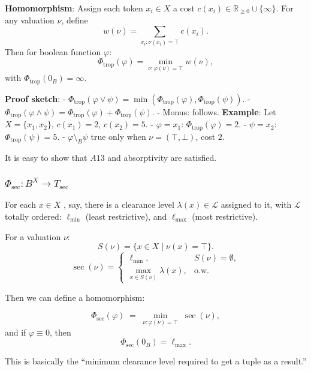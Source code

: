\textbf{Homomorphism}:\newline
Assign each token \(x_i\in X\) a cost \(c(x_i)\in\mathbb{R}_{\ge0}\cup\{\infty\}\). For any valuation \(\nu\), define
$$
w(\nu) = \sum_{x_i:\nu(x_i)=\top} c(x_i).
$$
Then for boolean function  \(\varphi\):
$$
\Phi_{\mathrm{trop}}(\varphi) 
= \min_{\nu:\varphi(\nu)=\top} w(\nu),
$$
with \(\Phi_{\mathrm{trop}}(0_B)=\infty\).
\newline

\textbf{Proof sketch}: \newline
- \(\Phi_{\mathrm{trop}}(\varphi \vee \psi) = \min(\Phi_{\mathrm{trop}}(\varphi), \Phi_{\mathrm{trop}}(\psi))\).  
- \(\Phi_{\mathrm{trop}}(\varphi \wedge \psi) = \Phi_{\mathrm{trop}}(\varphi) + \Phi_{\mathrm{trop}}(\psi)\).  
- Monus: follows. \newline
\textbf{Example}: \newline
Let \(X=\{x_1,x_2\}\), \(c(x_1)=2\), \(c(x_2)=5\).  
- \(\varphi = x_1\): \(\Phi_{\mathrm{trop}}(\varphi)=2\).  
- \(\psi = x_2\): \(\Phi_{\mathrm{trop}}(\psi)=5\).  
- \(\varphi \setminus_B \psi\) true only when \(\nu=(\top,\bot)\), cost \(2\).

It is easy to show that $A13$ and absorptivity are satisfied.


\subsubsection{$\Phi_{\mathrm{sec}}: B^X \to T_{\sec}$}

For each \(x\in X\) , say, there is a clearance level \(\lambda(x)\in \mathcal L\) assigned to it,
with \(\mathcal L\) totally ordered: \(\ell_{\min}\) (least restrictive),
and \(\ell_{\max}\) (most restrictive).

For a valuation \(\nu\):
\[
S(\nu) = \{x\in X \mid \nu(x)=\top\}.
\]
\[
\sec(\nu) =
\begin{cases}
\ell_{\min}, & S(\nu)=\emptyset,\\
\max_{x\in S(\nu)} \lambda(x), & \text{o.w.}
\end{cases}
\]



Then we can define a homomorphism:

\[
\Phi_{\mathrm{sec}}(\varphi)
\;=\;
\min_{\nu:\varphi(\nu)=\top}\;\sec(\nu),
\]
and if \(\varphi\equiv 0\), then
\[
\Phi_{\mathrm{sec}}(0_B) = \ell_{\max}.
\]

This is basically the “minimum clearance level required to get a tuple as a result.”



